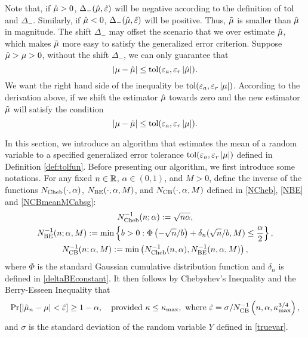 \documentclass{iitthesis}
\theoremstyle{definition}
\begin{document}
Note that, if $\hat{\mu} >0$, $\Delta_{-}(\hat{\mu},\hat{\varepsilon})$ will be negative according to the definition of $\operatorname{tol}$ and $\Delta_{-}$. Similarly, if $\hat{\mu} <0$, $\Delta_{-}(\hat{\mu},\hat{\varepsilon})$ will be positive. Thus, $\tilde{\mu}$ is smaller than $\hat{\mu}$ in magnitude. The shift $\Delta_-$ may offset the scenario that we over estimate $\hat{\mu}$, which makes $\tilde{\mu}$ more easy to satisfy the generalized error criterion. Suppose $\hat{\mu}>\mu>0$, without the shift $\Delta_-$, we can only guarantee that $$\left \lvert \mu-\hat{\mu} \right \rvert\leq \operatorname{tol}(\varepsilon_a,\varepsilon_r\left \lvert \hat{\mu} \right \rvert).$$ We want the right hand side of the inequality be $\operatorname{tol}(\varepsilon_a,\varepsilon_r\left \lvert \mu \right \rvert)$. According to the derivation above, if we shift the estimator $\hat{\mu}$ towards zero and the new estimator $\tilde{\mu}$ will satisfy the condition $$\left \lvert \mu-\tilde{\mu} \right \rvert \leq \operatorname{tol}(\varepsilon_a,\varepsilon_r\left \lvert \mu \right \rvert).$$
%

\label{sec:algmeanMCg}

In this section, we introduce an algorithm that estimates the mean of a random variable to a specified generalized error tolerance $\operatorname{tol}(\varepsilon_a, \varepsilon_r\left \lvert \mu \right \rvert)$ defined in Definition \ref{def:tolfun}. Before presenting our algorithm, we first introduce some notations. 
For any fixed $n \in \mathbb{R}$, $\alpha \in (0,1)$, and $M>0$, define the inverse of the functions $N_{\text{Cheb}}(\cdot,\alpha)$, $N_{\text{BE}}(\cdot,\alpha,M)$, and $N_{\text{CB}}(\cdot,\alpha,M)$ defined in \eqref{NCheb}, \eqref{NBE} and \eqref{NCBmeanMCabsg}:
\begin{gather}\label{NCinv*}
N_{\text{Cheb}}^{-1}(n;\alpha) := \sqrt{n \alpha}, \\
\label{NBinv*}
N_{\text{BE}}^{-1}(n;\alpha,M) := \min \left \{ b>0 : \Phi\left(-\sqrt{n}/b  \right)+\delta_n(\sqrt{n}/b,M)
\le \frac{\alpha}{2} \right \}, \\
\label{NCBinv}
N_{\text{CB}}^{-1}(n;\alpha,M) := \min\left(N_{\text{Cheb}}^{-1}(n,\alpha),N_{\text{BE}}^{-1}(n,\alpha,M)\right),
\end{gather}
where $\Phi$ is the standard Gaussian cumulative distribution function and $\delta_n$ is defined in \eqref{deltaBEconstant}. It then follows by Chebyshev's Inequality and the Berry-Esseen Inequality that 
\begin{equation*}
\Pr[\left \lvert \hat{\mu}_n -\mu \right \rvert<\hat{\varepsilon}] \geq 1-\alpha, \quad \text{provided } \kappa\leq\kappa_{\max}, \text{ where }\hat{\varepsilon}=\sigma/N_{\text{CB}}^{-1}\left(n,\alpha,\kappa_{\max}^{3/4}\right), 
\end{equation*} 
and $\sigma$ is the standard deviation of the random variable $Y$ defined in \eqref{truevar}.  
\end{document}

